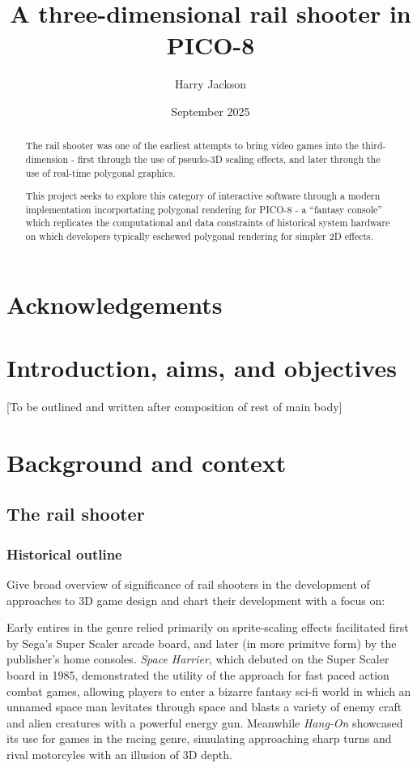 \documentclass{article}
\title{A three-dimensional rail shooter in PICO-8}
\author{Harry Jackson}
\date{September 2025}
\begin{document}
\maketitle

\begin{abstract}
The rail shooter was one of the earliest attempts to bring video
games into the third-dimension - first through the use of pseudo-3D
scaling effects, and later through the use of real-time polygonal graphics.

This project seeks to explore this category of interactive software through a
modern implementation incorportating polygonal rendering for PICO-8 - a
``fantasy console'' which replicates the computational and data constraints of
historical system hardware on which developers typically eschewed polygonal
rendering for simpler 2D effects.
\end{abstract}

\section*{Acknowledgements}

\tableofcontents

\section{Introduction, aims, and objectives}
[To be outlined and written after composition of rest of main body]


\section{Background and context}

\subsection{The rail shooter}

\subsubsection*{Historical outline}
Give broad overview of significance of rail shooters in the development of approaches
to 3D game design and chart their development with a focus on:

Early entires in the genre relied primarily on sprite-scaling effects facilitated first by
Sega's Super Scaler arcade board, and later (in more primitve form) by the publisher's
home consoles. \textit{Space Harrier}, which debuted on the Super Scaler board in 1985, demonstrated
the utility of the approach for fast paced action combat games, allowing players to enter a bizarre
fantasy sci-fi world in which an unnamed space man levitates through space and blasts a variety of
enemy craft and alien creatures with a powerful energy gun. Meanwhile \textit{Hang-On} showcased its use
for games in the racing genre, simulating approaching sharp turns and rival motorcyles with an illusion
of 3D depth.
\end{document}
